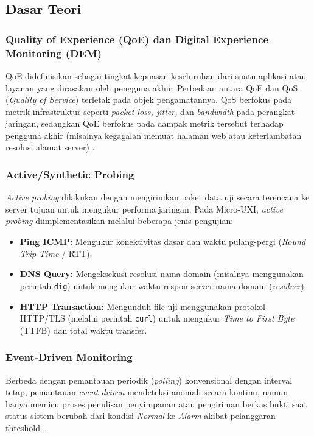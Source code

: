 \subsection{Dasar Teori}

\subsubsection{Quality of Experience (QoE) dan Digital Experience Monitoring (DEM)}
QoE didefinisikan sebagai tingkat kepuasan keseluruhan dari suatu aplikasi atau layanan yang dirasakan oleh pengguna akhir. Perbedaan antara QoE dan QoS (\textit{Quality of Service}) terletak pada objek pengamatannya. QoS berfokus pada metrik infrastruktur seperti \textit{packet loss, jitter,} dan \textit{bandwidth} pada perangkat jaringan, sedangkan QoE berfokus pada dampak metrik tersebut terhadap pengguna akhir (misalnya kegagalan memuat halaman web atau keterlambatan resolusi alamat server) \cite{barakabitze2020}.

\subsubsection{Active/Synthetic Probing}
\textit{Active probing} dilakukan dengan mengirimkan paket data uji secara terencana ke server tujuan untuk mengukur performa jaringan. Pada Micro-UXI, \textit{active probing} diimplementasikan melalui beberapa jenis pengujian:
\begin{itemize}
    \item \textbf{Ping ICMP:} Mengukur konektivitas dasar dan waktu pulang-pergi (\textit{Round Trip Time} / RTT).
    \item \textbf{DNS Query:} Mengeksekusi resolusi nama domain (misalnya menggunakan perintah \texttt{dig}) untuk mengukur waktu respon server nama domain (\textit{resolver}).
    \item \textbf{HTTP Transaction:} Mengunduh file uji menggunakan protokol HTTP/TLS (melalui perintah \texttt{curl}) untuk mengukur \textit{Time to First Byte} (TTFB) dan total waktu transfer.
\end{itemize}

\subsubsection{Event-Driven Monitoring}
Berbeda dengan pemantauan periodik (\textit{polling}) konvensional dengan interval tetap, pemantauan \textit{event-driven} mendeteksi anomali secara kontinu, namun hanya memicu proses penulisan penyimpanan atau pengiriman berkas bukti saat status sistem berubah dari kondisi \textit{Normal} ke \textit{Alarm} akibat pelanggaran threshold \cite{kucera2020}.

